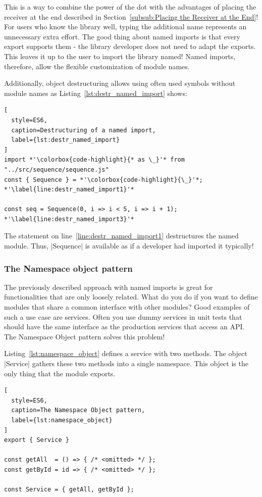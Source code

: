 This is a way to combine the power of the dot with the advantages of placing
the receiver at the end described in Section~\ref{subsub:Placing the Receiver
at the End}! \\
For users who know the library well, typing the additional name represents an
unnecessary extra effort. The good thing about named imports is that every
export supports them - the library developer does not need to adapt the
exports. \\
This leaves it up to the user to import the library named! Named
imports, therefore, allow the flexible customization of module names.

Additionally, object destructuring allows using often used symbols without
module names as Listing~\ref{lst:destr_named_import} shows:

\begin{lstlisting}[
  style=ES6,
  caption=Destructuring of a named import,
  label={lst:destr_named_import}
]
import *'\colorbox{code-highlight}{* as \_}'* from "../src/sequence/sequence.js" 
const { Sequence } = *'\colorbox{code-highlight}{\_}'*; *'\label{line:destr_named_import1}'*

const seq = Sequence(0, i => i < 5, i => i + 1); *'\label{line:destr_named_import3}'*
\end{lstlisting}

The statement on line~\ref{line:destr_named_import1} destructures the named
module. Thus, |Sequence| is available as if a developer had imported it
typically!


\subsubsection{The Namespace object pattern} %
\label{subsub:The Namespace Object Pattern}
The previously described approach with named imports is great for
functionalities that are only loosely related. What do you do if you want to
define modules that share a common interface with other modules? Good examples
of such a use case are services. Often you use dummy services in unit tests
that should have the same interface as the production services that access an
API. The Namespace Object pattern solves this problem!

Listing~\ref{lst:namespace_object} defines a service with two methods. The
object |Service| gathers these two methods into a single namespace. This object
is the only thing that the module exports.

\begin{lstlisting}[
  style=ES6,
  caption=The Namespace Object pattern,
  label={lst:namespace_object}
]
export { Service }

const getAll  = () => { /* <omitted> */ };
const getById = id => { /* <omitted> */ };

const Service = { getAll, getById };
\end{lstlisting}

